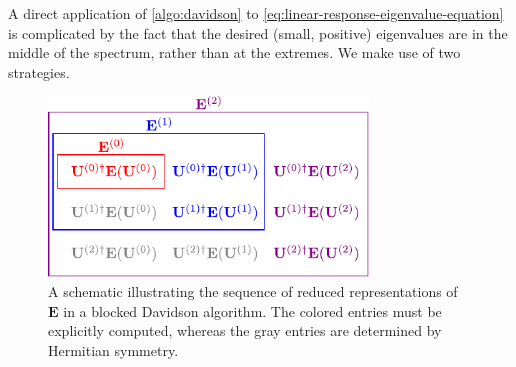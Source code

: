 A direct application of \cref{algo:davidson} to
\cref{eq:linear-response-eigenvalue-equation} is complicated by the fact that
the desired (small, positive) eigenvalues are in the middle of the spectrum,
rather than at the extremes.
We make use of two strategies.

\begin{figure}[h!]
    \centering
    \caption{%
        \label{fig:davidson}
        A schematic illustrating the sequence of reduced representations of
        \(\mathbf{E}\) in a blocked Davidson algorithm.
        The colored entries must be explicitly computed, whereas the gray
        entries are determined by Hermitian symmetry.
    }
    \includegraphics[width=8.5cm]{figures/davidson.pdf}
\end{figure}


